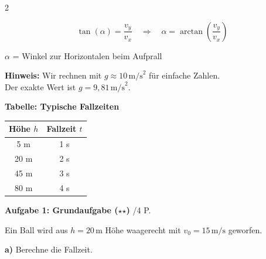 \documentclass[10pt, a4paper]{article}
\newcommand{\fachfarbe}{physik}
\newcommand{\stmark}{$\star$}
\newcommand{\abschnitt}[1]{%
    \vspace{8pt}
    \noindent\textbf{\textcolor{\fachfarbe}{#1}}
    \vspace{4pt}
}
\newcommand{\punkte}[1]{\hfill\small\textcolor{grau}{/#1 P.}}
\begin{document}
\begin{multicols}{2}
\begin{formelbox}
\begin{equation*}
\tan(\alpha) = \frac{v_y}{v_x} \quad \Rightarrow \quad \alpha = \arctan\left(\frac{v_y}{v_x}\right)
\end{equation*}

\vspace{2pt}
\footnotesize
$\alpha$ = Winkel zur Horizontalen beim Aufprall
\end{formelbox}

\vspace{4pt}

\begin{hinweisbox}
\footnotesize
\textbf{Hinweis:} Wir rechnen mit $g \approx 10\,\text{m/s}^2$ für einfache Zahlen.\\
Der exakte Wert ist $g = 9{,}81\,\text{m/s}^2$.
\end{hinweisbox}


\columnbreak


\abschnitt{Tabelle: Typische Fallzeiten}

\begin{center}
\begin{tabular}{|c|c|}
\hline
\textbf{Höhe $h$} & \textbf{Fallzeit $t$} \\
\hline
5 m & 1 s \\
\hline
20 m & 2 s \\
\hline
45 m & 3 s \\
\hline
80 m & 4 s \\
\hline
\end{tabular}
\end{center}

\vspace{2pt}


\abschnitt{Aufgabe 1: Grundaufgabe (\stmark\stmark)}\punkte{4}

Ein Ball wird aus $h = 20\,\text{m}$ Höhe waagerecht mit $v_0 = 15\,\text{m/s}$ geworfen.

\textbf{a)} Berechne die Fallzeit.


\end{multicols}
\end{document}
